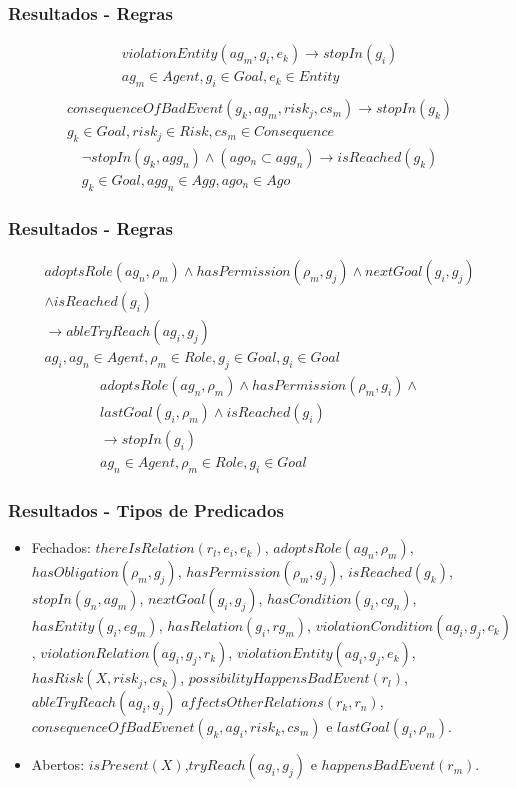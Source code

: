 \documentclass{beamer}
\begin{document}
\begin{frame}
	\frametitle{Resultados - Regras}
	\begin{eqnarray}\label{consvioent}
		violationEntity(ag_m,g_i,e_k) \to stopIn(g_i) \nonumber \\  
	    ag_m \in Agent, g_i \in Goal, e_k \in Entity \\ \nonumber
	\end{eqnarray}
	\begin{eqnarray}\label{badcons}
		consequenceOfBadEvent(g_k,ag_m,risk_j,cs_m) \to stopIn(g_k) \nonumber \\ 
	    g_k \in Goal, risk_j \in Risk, cs_m \in Consequence
	\end{eqnarray}
	\begin{eqnarray}\label{wenStop}
		\neg stopIn(g_k,agg_n) \wedge (ago_n \subset agg_n) \to isReached(g_k) \nonumber \\ 
	    g_k \in Goal, agg_n \in Agg, ago_n \in Ago 
	\end{eqnarray}
\end{frame}
\begin{frame}
	\frametitle{Resultados - Regras}
	\begin{eqnarray}\label{rolenextgoal}
		adoptsRole(ag_n,\rho_m) \wedge hasPermission(\rho_m,g_j) \wedge nextGoal(g_i,g_j) \nonumber \\
		\wedge isReached(g_i) \nonumber \\
		\to ableTryReach(ag_i,g_j) \nonumber \\
	    ag_i, ag_n \in Agent, \rho_m \in Role, g_j \in Goal, g_i \in Goal
	\end{eqnarray}
	\begin{eqnarray}\label{rolelastgoal}
		adoptsRole(ag_n,\rho_m) \wedge hasPermission(\rho_m,g_i) \wedge \nonumber \\
		lastGoal(g_i,\rho_m) \wedge isReached(g_i) \nonumber \\
		\to stopIn(g_i) \nonumber \\
	    ag_n \in Agent, \rho_m \in Role, g_i \in Goal
	\end{eqnarray}
\end{frame}
\begin{frame}
	\frametitle{Resultados - Tipos de Predicados}
	\begin{itemize}
		\item Fechados: $thereIsRelation(r_l,e_i,e_k)$, $adoptsRole(ag_n,\rho_m)$, $hasObligation(\rho_m,g_j)$,
		$hasPermission(\rho_m, g_j)$, $isReached(g_k)$, $stopIn(g_n, ag_m)$, $nextGoal(g_i,g_j)$, $hasCondition(g_i,cg_n)$,
		$hasEntity(g_i,eg_m)$, $hasRelation(g_i,rg_m)$, $violationCondition(ag_i,g_j,c_k) $, $ violationRelation(ag_i,g_j,r_k) $,
		$ violationEntity(ag_i,g_j,e_k) $,  $ hasRisk(X, risk_j, cs_k) $, $possibilityHappensBadEvent(r_l)$, $ableTryReach(ag_i,g_j)$ 
		$affectsOtherRelations(r_k,r_n)$, $consequenceOfBadEvenet(g_k, ag_i,risk_k,cs_m)$  e $lastGoal(g_i,\rho_m)$.
		\item Abertos: $isPresent(X)$,$tryReach(ag_i,g_j)$ e $happensBadEvent(r_m)$.
	\end{itemize}
\end{frame}
\end{document}
